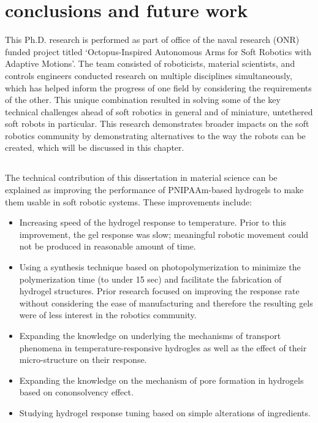 \graphicspath{{Images/conclusion/}}

\chapter{conclusions and future work}
\label{chap:conclusion}
This Ph.D. research is performed as part of office of the naval research (ONR) funded project titled `Octopus-Inspired Autonomous Arms for Soft Robotics with Adaptive Motions'. The team consisted of roboticists, material scientists, and controls engineers conducted research on multiple disciplines simultaneously, which has helped inform the progress of one field by considering the requirements of the other. This unique combination resulted in solving some of the key technical challenges ahead of soft robotics in general and of miniature, untethered soft robots in particular. This research demonstrates broader impacts on the soft robotics community by demonstrating alternatives to the way the robots can be created, which will be discussed in this chapter.
\section{}
The technical contribution of this dissertation in material science can be explained as improving the performance of PNIPAAm-based hydrogels to make them usable in soft robotic systems. These improvements include:
\begin{itemize}
 \item Increasing speed of the hydrogel response to temperature. Prior to this improvement, the gel response was slow; meaningful robotic movement could not be produced in reasonable amount of time. 
 \item Using a synthesis technique based on photopolymerization to minimize the polymerization time (to under 15 sec) and facilitate the fabrication of hydrogel structures. Prior research focused on improving the response rate without considering the ease of manufacturing and therefore the resulting gels were of less interest in the robotics community.
 \item Expanding the knowledge on underlying the mechanisms of transport phenomena in temperature-responsive hydrogles as well as the effect of their micro-structure on their response. 
 \item Expanding the knowledge on the mechanism of pore formation in hydrogels based on cononsolvency effect. 
 \item Studying hydrogel response tuning based on simple alterations of ingredients. 
\end{itemize}
	
